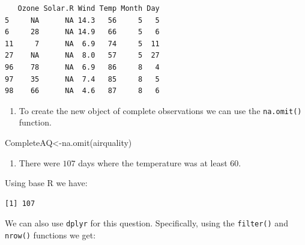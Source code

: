 \documentclass[
  letterpaper,
  DIV=11,
  numbers=noendperiod]{scrreprt}
\newenvironment{Shaded}{\begin{snugshade}}{\end{snugshade}}
\newcommand{\DecValTok}[1]{\textcolor[rgb]{0.68,0.00,0.00}{#1}}
\newcommand{\FunctionTok}[1]{\textcolor[rgb]{0.28,0.35,0.67}{#1}}
\newcommand{\NormalTok}[1]{\textcolor[rgb]{0.00,0.23,0.31}{#1}}
\newcommand{\OtherTok}[1]{\textcolor[rgb]{0.00,0.23,0.31}{#1}}
\newcommand{\SpecialCharTok}[1]{\textcolor[rgb]{0.37,0.37,0.37}{#1}}
\providecommand{\tightlist}{%
  \setlength{\itemsep}{0pt}\setlength{\parskip}{0pt}}\usepackage{longtable,booktabs,array}
\begin{document}
\begin{Shaded}
\end{Shaded}

\begin{verbatim}
   Ozone Solar.R Wind Temp Month Day
5     NA      NA 14.3   56     5   5
6     28      NA 14.9   66     5   6
11     7      NA  6.9   74     5  11
27    NA      NA  8.0   57     5  27
96    78      NA  6.9   86     8   4
97    35      NA  7.4   85     8   5
98    66      NA  4.6   87     8   6
\end{verbatim}

\begin{enumerate}
\def\labelenumi{\arabic{enumi}.}
\setcounter{enumi}{3}
\tightlist
\item
  To create the new object of complete observations we can use the
  \texttt{na.omit()} function.
\end{enumerate}

\begin{Shaded}
\begin{Highlighting}[numbers=left,,]
\NormalTok{CompleteAQ}\OtherTok{\textless{}{-}}\FunctionTok{na.omit}\NormalTok{(airquality)}
\end{Highlighting}
\end{Shaded}

\begin{enumerate}
\def\labelenumi{\arabic{enumi}.}
\setcounter{enumi}{4}
\tightlist
\item
  There were \(107\) days where the temperature was at least \(60\).
\end{enumerate}

Using base R we have:

\begin{Shaded}
\end{Shaded}

\begin{verbatim}
[1] 107
\end{verbatim}

We can also use \texttt{dplyr} for this question. Specifically, using
the \texttt{filter()} and \texttt{nrow()} functions we get:
\end{document}

